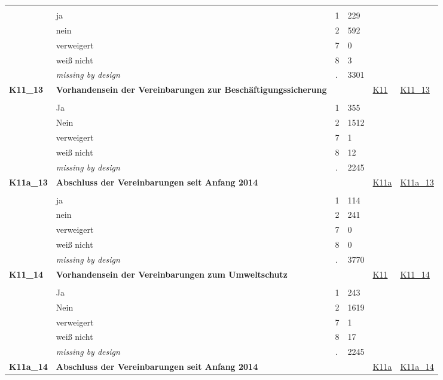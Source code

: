 \begin{longtable}{| L{2.45cm} | L{6cm} | C{1.5cm} | R{1cm} | C{2.25cm} | C{2.25cm} |}
   &  &  &  &  &  \\ 
   & ja & 1 & 229 &  &  \\ 
   & nein & 2 & 592 &  &  \\ 
   & verweigert & 7 & 0 &  &  \\ 
   & weiß nicht & 8 & 3 &  &  \\ 
   & \textit{missing by design} & \textit{.} & 3301 &  &  \\ 
   \midrule
\textbf{K11\_13}\label{var:K11:13} & \textbf{Vorhandensein der Vereinbarungen zur Beschäftigungssicherung} &  &  & \hyperref[K11]{K11} & \hyperref[var:suf:K11:13]{K11\_13} \\ 
   &  &  &  &  &  \\ 
   & Ja & 1 & 355 &  &  \\ 
   & Nein & 2 & 1512 &  &  \\ 
   & verweigert & 7 & 1 &  &  \\ 
   & weiß nicht & 8 & 12 &  &  \\ 
   & \textit{missing by design} & \textit{.} & 2245 &  &  \\ 
   \midrule
\textbf{K11a\_13}\label{var:K11a:13} & \textbf{Abschluss der Vereinbarungen seit Anfang 2014} &  &  & \hyperref[K11a]{K11a} & \hyperref[var:suf:K11a:13]{K11a\_13} \\ 
   &  &  &  &  &  \\ 
   & ja & 1 & 114 &  &  \\ 
   & nein & 2 & 241 &  &  \\ 
   & verweigert & 7 & 0 &  &  \\ 
   & weiß nicht & 8 & 0 &  &  \\ 
   & \textit{missing by design} & \textit{.} & 3770 &  &  \\ 
   \midrule
\textbf{K11\_14}\label{var:K11:14} & \textbf{Vorhandensein der Vereinbarungen zum Umweltschutz} &  &  & \hyperref[K11]{K11} & \hyperref[var:suf:K11:14]{K11\_14} \\ 
   &  &  &  &  &  \\ 
   & Ja & 1 & 243 &  &  \\ 
   & Nein & 2 & 1619 &  &  \\ 
   & verweigert & 7 & 1 &  &  \\ 
   & weiß nicht & 8 & 17 &  &  \\ 
   & \textit{missing by design} & \textit{.} & 2245 &  &  \\ 
   \midrule
\textbf{K11a\_14}\label{var:K11a:14} & \textbf{Abschluss der Vereinbarungen seit Anfang 2014} &  &  & \hyperref[K11a]{K11a} & \hyperref[var:suf:K11a:14]{K11a\_14} \\ 

\end{longtable}
